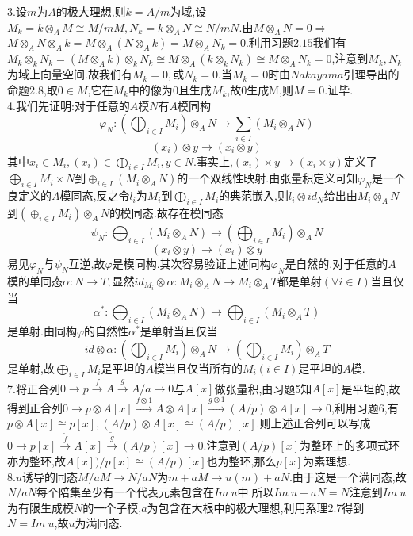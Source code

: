 \documentclass[b5paper]{ctexart}
\newcommand{\ts}[2]{#1\otimes #2}
\newcommand{\tss}[3]{#1\otimes_{#2} #3}
\newcommand{\ess}[5]{$0\xrightarrow{}#1\xrightarrow{#2}#3\xrightarrow{#4}#5\xrightarrow{}0$}
\begin{document}
3.设$m$为$A$的极大理想,则$k=A/m$为域,设$M_k=\tss{k}{A}{M}\cong M/mM,N_k=\tss{k}{A}{N}\cong N/mN$.由$\tss{M}{A}{N}=0\Rightarrow$$\tss{\tss{M}{A}{N}}{A}{k}=\tss{M}{A}{(\tss{N}{A}{k})}=\tss{M}{A}{N_k}=0$.利用习题$2.15$我们有$\tss{M_k}{k}{N_k}=\tss{(\tss{M}{A}{k})}{k}{N_k}\cong \tss{M}{A}{(\tss{k}{k}{N_k})}\cong \tss{M}{A}{N_k}=0$,注意到$M_k,N_k$为域上向量空间.故我们有$M_k=0,$或$N_k=0$.当$M_k=0$时由$Nakayama$引理导出的命题2.8,取$0\in M$,它在$M_k$中的像为$0$且生成$M_k$,故0生成M,则$M=0$.证毕.\\
4.我们先证明:对于任意的$A$模$N$有$A$模同构
\[\varphi_N:\left( \bigoplus_{i\in I}M_i\right) \otimes_AN\rightarrow \sum_{i\in I}(M_i\otimes_A N)\]
\[(x_i)\otimes y\rightarrow (x_i\otimes y)\]
其中$x_i\in M_i,(x_i)\in \bigoplus_{i\in I}M_i,y\in N$.事实上,$(x_i)\times y\rightarrow (x_i\times y)$定义了$\bigoplus_{i\in I}M_i\times N$到$\oplus_{i
\in I}(M_i\otimes_AN)$的一个双线性映射.由张量积定义可知$\varphi_N$是一个良定义的$A$模同态,反之令$l_i$为$M_i$到$\bigoplus_{i\in I}M_i$的典范嵌入,则$l_i\otimes id_N$给出由$M_i\otimes_AN$到$\left( \oplus_{i\in I}M_i\right) \otimes_AN$的模同态.故存在模同态
\[\psi_N: \bigoplus_{i\in I}(M_i\otimes_AN)\rightarrow \left( \bigoplus_{i\in I}M_i\right) \otimes_AN\]
\[(x_i\otimes y)\rightarrow (x_i)\otimes y\]
易见$\varphi_N$与$\psi_N$互逆,故$\varphi$是模同构.其次容易验证上述同构$\varphi_N$是自然的.对于任意的$A$模的单同态$\alpha:N\rightarrow T,$显然$id_{M_i}\otimes \alpha:M_i\otimes_{A}N\rightarrow M_i\otimes_A T$都是单射$(\forall i\in I)$当且仅当
\[\alpha^*:\bigoplus_{i\in I}(M_i\otimes_A N)\rightarrow \bigoplus_{i\in I}(M_i\otimes_AT)\]是单射.由同构$\varphi$的自然性$\alpha^*$是单射当且仅当
\[id\otimes\alpha:\left( \bigoplus_{i\in I}M_i\right) \otimes_A N\rightarrow\left(  \bigoplus_{i\in I}M_i\right) \otimes_AT\]
是单射,故$\bigoplus_{i\in I}M_i$是平坦的$A$模当且仅当所有的$M_i(i\in I)$是平坦的$A$模.\\
7.将正合列\ess{p}{f}{A}{g}{A/a}与$A[x]$做张量积,由习题5知$A[x]$是平坦的,故得到正合列\ess{\ts{p}{A[x]}}{\ts{f}{1}}{\ts{A}{A[x]}}{\ts{g}{1}}{\ts{(A/p)}{A[x]}},利用习题6,有$\ts{p}{A[x]}\cong p[x],\ts{(A/p)}{A[x]}\cong (A/p)[x]$.则上述正合列可以写成\ess{p[x]}{\tilde{f}}{A[x]}{\tilde{g}}{(A/p)[x]}.注意到$(A/p)[x]$为整环上的多项式环亦为整环,故$A[x])/p[x]\cong (A/p)[x]$也为整环,那么$p[x]$为素理想.\\
8.$u$诱导的同态$M/aM  \rightarrow N/aN$为$m+aM\rightarrow u(m)+aN
$.由于这是一个满同态,故$N/aN$每个陪集至少有一个代表元素包含在$Im~u$中.所以$Im~u+aN=N$注意到$Im~u$为有限生成模$N$的一个子模,$a$为包含在大根中的极大理想,利用系理2.7得到$N=Im~u$,故$u$为满同态.\\
$$
\end{document}
